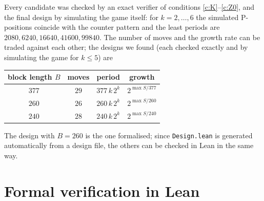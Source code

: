 \documentclass[11pt]{article}
\theoremstyle{definition}
\newcommand{\nmoves}{26}
\begin{document}
Every candidate was checked by an exact verifier of conditions \ref{c:K}--\ref{c:Z0}, and the final
design by simulating the game itself: for $k=2,\dots,6$ the simulated P-positions coincide with the
counter pattern and the least periods are $2080,6240,16640,41600,99840$.  The number of moves and the growth rate can be traded against each other; the designs we found
(each checked exactly and by simulating the game for $k\le5$) are
\begin{center}\small
\begin{tabular}{cccc}
\toprule
block length $B$ & moves & period & growth \\
\midrule
$377$ & $29$ & $377\,k\,2^k$ & $2^{\max S/377}$ \\
$260$ & $\nmoves$ & $260\,k\,2^k$ & $2^{\max S/260}$ \\
$240$ & $28$ & $240\,k\,2^k$ & $2^{\max S/240}$ \\
\bottomrule
\end{tabular}
\end{center}
The design with $B=260$ is the one formalised; since \texttt{Design.lean} is generated automatically
from a design file, the others can be checked in Lean in the same way.

\section{Formal verification in Lean}\label{sec:lean}
\end{document}
